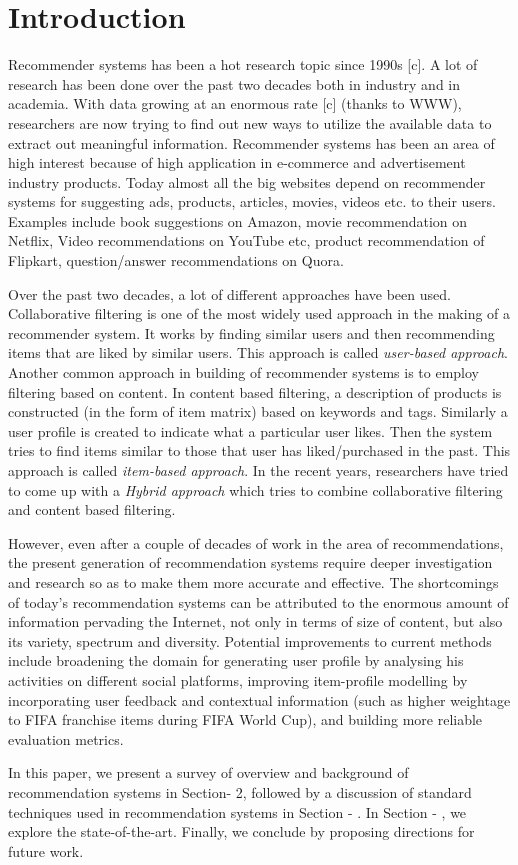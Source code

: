 \section{Introduction}
Recommender systems has been a hot research topic since 1990s [c]. A lot of research has been done over the past two decades both in industry and in academia. With data growing at an enormous rate [c] (thanks to WWW), researchers are now trying to find out new ways to utilize the available data to extract out meaningful information.  Recommender systems has been an area of high interest because of high application in e-commerce and advertisement industry products. Today almost all the big websites depend on recommender systems for suggesting ads, products, articles, movies, videos etc. to their users. Examples include book suggestions on Amazon, movie recommendation on Netflix, Video recommendations on YouTube etc, product recommendation of Flipkart, question/answer recommendations on Quora. 

Over the past two decades, a lot of different approaches have been used. Collaborative filtering is one of the most widely used approach in the making of a recommender system. It works by finding similar users and then recommending items that are liked by similar users. This approach is called \textit{user-based approach}. Another common approach in building of recommender systems is to employ filtering based on content. In content based filtering, a description of products is constructed (in the form of item matrix) based on keywords and tags. Similarly a user profile is created to indicate what a particular user likes. Then the system tries to find items similar to those that user has liked/purchased in the past. This approach is called \textit{item-based approach}. In the recent years, researchers have tried to come up with a \textit{Hybrid approach} which tries to combine collaborative filtering and content based filtering. 

However, even after a couple of decades of work in the area of recommendations, the present generation of recommendation systems require deeper investigation and research so as to make them more accurate and effective. The shortcomings of today's recommendation systems can be attributed to the enormous amount of information pervading the Internet, not only in terms of size of content, but also its variety, spectrum and diversity. Potential improvements to current methods include broadening the domain for generating user profile by analysing his activities on different social platforms, improving item-profile modelling by incorporating user feedback and contextual information (such as higher weightage to FIFA franchise items during FIFA World Cup), and building more reliable evaluation metrics. 

In this paper, we present a survey of overview and background of recommendation systems in Section- 2, followed by a discussion of standard techniques used in recommendation systems in Section - . In Section - , we explore the state-of-the-art. Finally, we conclude by proposing directions for future work. 